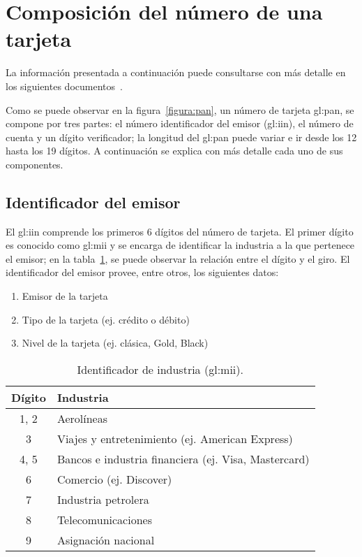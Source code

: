 %
%

\section{Composición del número de una tarjeta}
\label{sec:composicion_tarjeta}

La información presentada a continuación puede consultarse con más detalle en
los siguientes documentos~\cite{iso_7812, iso_9362, pci_definitive_guide}.

Como se puede observar en la figura~\ref{figura:pan}, un número de tarjeta
\gls{gl:pan}, se compone por tres partes: el número identificador del emisor
(\gls{gl:iin}), el número de cuenta y un dígito verificador; la longitud del
\gls{gl:pan} puede variar e ir desde los 12 hasta los 19 dígitos. A
continuación se explica con más detalle cada uno de sus componentes.

\subsection{Identificador del emisor}
El \gls{gl:iin} comprende los primeros 6 dígitos del número de
tarjeta. El primer dígito es conocido como \gls{gl:mii} y se encarga de
identificar la industria a la que pertenece el emisor; en la
tabla~\ref{tabla:mii}, se puede observar la relación entre el dígito y el giro.
El identificador del emisor provee, entre otros, los siguientes datos:

\begin{enumerate}
    \item Emisor de la tarjeta
    \item Tipo de la tarjeta (ej. crédito o débito)
    \item Nivel de la tarjeta (ej. clásica, Gold, Black)
\end{enumerate}

\begin{table}
  \centering
  \begin{tabular}{ c|l }
    Dígito & Industria \\ \hline
    1, 2 & Aerolíneas \\
    3 & Viajes y entretenimiento (ej. American Express) \\
    4, 5 &  Bancos e industria financiera (ej. Visa, Mastercard)\\
    6 & Comercio (ej. Discover) \\
    7 &  Industria petrolera \\
    8 &  Telecomunicaciones \\
    9 &  Asignación nacional \\
    \end{tabular}
    \caption{Identificador de industria (\gls{gl:mii}).}\label{tabla:mii}
\end{table}

